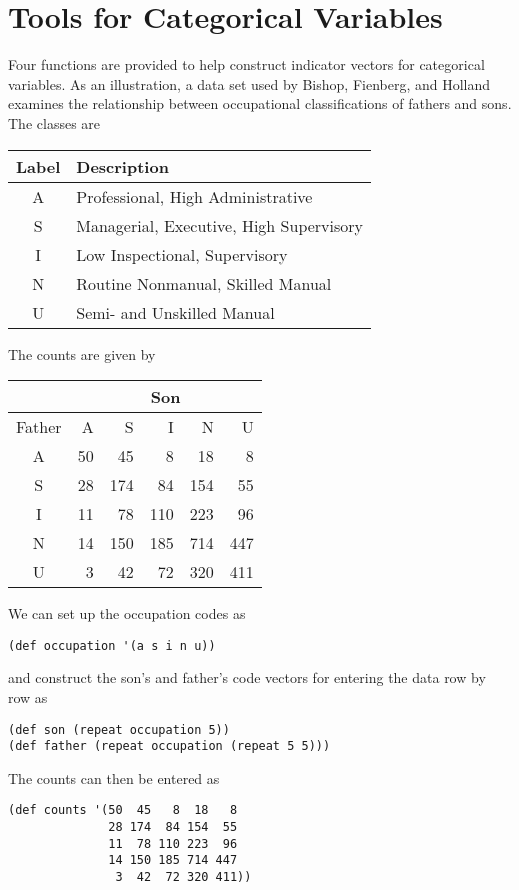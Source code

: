 \section{Tools for Categorical Variables}
Four functions are provided to help construct indicator vectors for
categorical variables. As an illustration, a data set used by Bishop,
Fienberg, and Holland examines the relationship between occupational
classifications of fathers and sons. The classes are
\begin{center}
\begin{tabular}{|c|l|}
\hline
Label & Description\\
\hline
A     & Professional, High Administrative\\
S     & Managerial, Executive, High Supervisory\\
I     & Low Inspectional, Supervisory\\
N     & Routine Nonmanual, Skilled Manual\\
U     & Semi- and Unskilled Manual\\
\hline
\end{tabular}
\end{center}
The counts are given by
\begin{center}
\begin{tabular}{|c|rrrrr|}
\hline
       & \multicolumn{5}{c|}{Son}\\
\hline
Father &  A &   S &   I &   N &   U \\
\hline
 A     & 50 &  45 &   8 &  18 &   8 \\
 S     & 28 & 174 &  84 & 154 &  55 \\
 I     & 11 &  78 & 110 & 223 &  96 \\
 N     & 14 & 150 & 185 & 714 & 447 \\
 U     &  3 &  42 &  72 & 320 & 411 \\
\hline
\end{tabular}
\end{center}

We can set up the occupation codes as
\begin{verbatim}
(def occupation '(a s i n u))
\end{verbatim}
and construct the son's and father's code vectors for entering the
data row by row as
\begin{verbatim}
(def son (repeat occupation 5))
(def father (repeat occupation (repeat 5 5)))
\end{verbatim}
The counts can then be entered as
\begin{verbatim}
(def counts '(50  45   8  18   8 
              28 174  84 154  55 
              11  78 110 223  96
              14 150 185 714 447
               3  42  72 320 411))
\end{verbatim}

